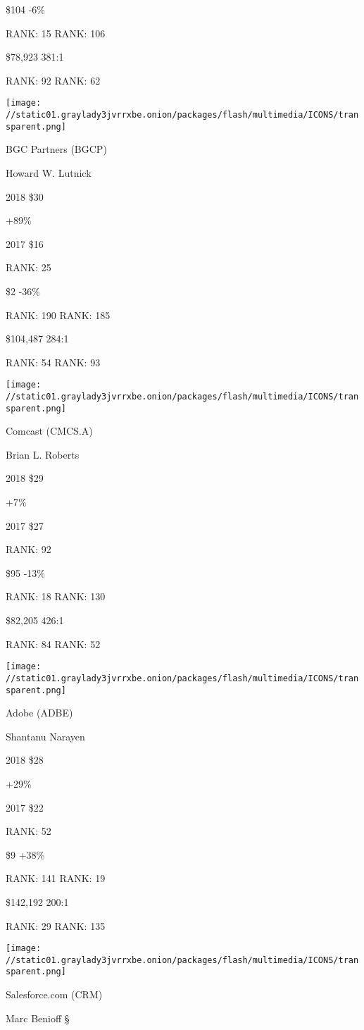  \$104 -6\%

RANK: 15 RANK: 106

 \$78,923 381:1

RANK: 92 RANK: 62

\texttt{[image: //static01.graylady3jvrrxbe.onion/packages/flash/multimedia/ICONS/transparent.png]}

BGC Partners (BGCP)

Howard W. Lutnick \protect\hyperlink{g-footnotes}{}

2018 \$30

 +89\%

2017 \$16

RANK: 25

 \$2 -36\%

RANK: 190 RANK: 185

 \$104,487 284:1

RANK: 54 RANK: 93

\texttt{[image: //static01.graylady3jvrrxbe.onion/packages/flash/multimedia/ICONS/transparent.png]}

Comcast (CMCS.A)

Brian L. Roberts \protect\hyperlink{g-footnotes}{}

2018 \$29

 +7\%

2017 \$27

RANK: 92

 \$95 -13\%

RANK: 18 RANK: 130

 \$82,205 426:1

RANK: 84 RANK: 52

\texttt{[image: //static01.graylady3jvrrxbe.onion/packages/flash/multimedia/ICONS/transparent.png]}

Adobe (ADBE)

Shantanu Narayen \protect\hyperlink{g-footnotes}{}

2018 \$28

 +29\%

2017 \$22

RANK: 52

 \$9 +38\%

RANK: 141 RANK: 19

 \$142,192 200:1

RANK: 29 RANK: 135

\texttt{[image: //static01.graylady3jvrrxbe.onion/packages/flash/multimedia/ICONS/transparent.png]}

Salesforce.com (CRM)

Marc Benioff \protect\hyperlink{g-footnotes}{§}


